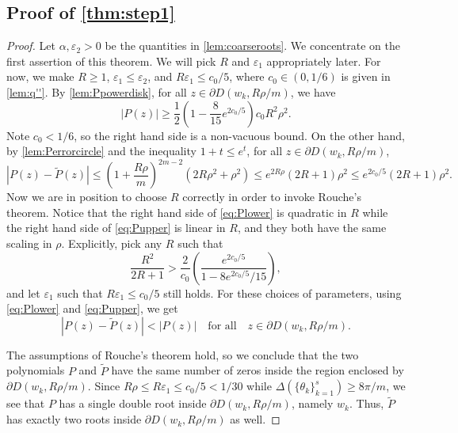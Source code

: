 \documentclass[11pt]{article}
\theoremstyle{definition}
\numberwithin{theorem}{section}
\numberwithin{equation}{section}
\renewcommand{\tilde}{\widetilde}
\renewcommand{\epsilon}{\varepsilon}
\def\forallspace{\quad\text{for all}\quad}
\numberwithin{equation}{section}
\begin{document}
\subsection{Proof of \cref{thm:step1}}
\label{proof:step1}

\begin{proof}
	Let $\alpha,\epsilon_2>0$ be the quantities in \cref{lem:coarseroots}. We concentrate on the first assertion of this theorem. We will pick $R$ and $\epsilon_1$ appropriately later. For now, we make $R\geq 1$, $\epsilon_1\leq \epsilon_2$, and $R\epsilon_1\leq c_0/5$, where $c_0\in (0,1/6)$ is given in \cref{lem:q''}. By \cref{lem:Ppowerdisk}, for all $z\in \partial D(w_k,R\rho/m)$, we have 
	\begin{equation}
		\label{eq:Plower}
		|P(z)| 
		\geq \frac 12 \left( 1 - \frac{8}{15} e^{2c_0/5}\right) c_0 R^2 \rho^2. 
	\end{equation}	
    Note $c_0<1/6$, so the right hand side is a non-vacuous bound. On the other hand, by \cref{lem:Perrorcircle} and the inequality $1+t\leq e^t$, for all $z\in \partial D(w_k,R\rho/m)$, 
	\begin{equation}
		\label{eq:Pupper}
		|P(z)-\tilde P(z)|
		\leq \left(1 + \frac{R\rho} m \right)^{2m-2} (2 R\rho^2 +\rho^2) 
        \leq e^{2R\rho} (2R+1)\rho^2
        \leq e^{2c_0/5} (2R+1)\rho^2. 
	\end{equation}
	Now we are in position to choose $R$ correctly in order to invoke Rouche's theorem. Notice that the right hand side of \eqref{eq:Plower} is quadratic in $R$ while the right hand side of \eqref{eq:Pupper} is linear in $R$, and they both have the same scaling in $\rho$. Explicitly, pick any $R$ such that 
    \begin{equation}
        \label{eq:Rcondition}
        \frac{R^2}{2R+1}> \frac 2 {c_0} \left(\frac{e^{2c_0/5}}{1-8e^{2c_0/5}/15}\right), 
    \end{equation}
    and let $\epsilon_1$ such that $R\epsilon_1 \leq c_0/5$ still holds. For these choices of parameters, using \eqref{eq:Plower} and \eqref{eq:Pupper}, we get
    $$
    |P(z)-\tilde P(z)|
    < |P(z)| \forallspace z\in \partial D(w_k,R\rho/m).
    $$
    
	The assumptions of Rouche's theorem hold, so we conclude that the two polynomials $P$ and $\tilde P$ have the same number of zeros inside the region enclosed by $\partial D(w_k,R\rho/m)$. Since $R\rho\leq R\epsilon_1\leq c_0/5 < 1/30$ while $\Delta(\{\theta_k\}_{k=1}^s)\geq 8\pi/m$, we see that $P$ has a single double root inside $\partial D(w_k,R\rho/m)$, namely $w_k$. Thus, $\tilde P$ has exactly two roots inside $\partial D(w_k,R\rho/m)$ as well. 
    

\end{proof}
\end{document}
